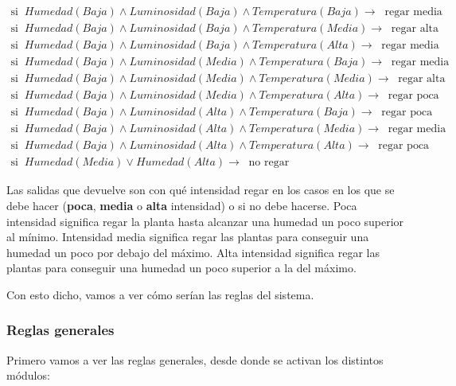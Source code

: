 \documentclass[11pt,a4paper]{article}
\begin{document}
\begin{gather*}
	\text{si} \; \; Humedad(Baja) \land Luminosidad(Baja) \land Temperatura(Baja) \rightarrow \; \; \text{regar media} \\
	\text{si} \; \; Humedad(Baja) \land Luminosidad(Baja) \land Temperatura(Media) \rightarrow \; \; \text{regar alta} \\
	\text{si} \; \; Humedad(Baja) \land Luminosidad(Baja) \land Temperatura(Alta) \rightarrow \; \; \text{regar media} \\
	\text{si} \; \; Humedad(Baja) \land Luminosidad(Media) \land Temperatura(Baja) \rightarrow \; \; \text{regar media} \\
	\text{si} \; \; Humedad(Baja) \land Luminosidad(Media) \land Temperatura(Media) \rightarrow \; \; \text{regar alta} \\
	\text{si} \; \; Humedad(Baja) \land Luminosidad(Media) \land Temperatura(Alta) \rightarrow \; \; \text{regar poca} \\
	\text{si} \; \; Humedad(Baja) \land Luminosidad(Alta) \land Temperatura(Baja) \rightarrow \; \; \text{regar poca} \\
	\text{si} \; \; Humedad(Baja) \land Luminosidad(Alta) \land Temperatura(Media) \rightarrow \; \; \text{regar media} \\
	\text{si} \; \; Humedad(Baja) \land Luminosidad(Alta) \land Temperatura(Alta) \rightarrow \; \; \text{regar poca} \\
	\text{si} \; \; Humedad(Media) \lor Humedad(Alta) \rightarrow \; \; \text{no regar}
\end{gather*}

Las salidas que devuelve son con qué intensidad regar en los casos en los que se debe hacer (\textbf{poca}, \textbf{media} o
\textbf{alta} intensidad) o si no debe hacerse. Poca intensidad significa regar la planta hasta alcanzar una humedad un poco
superior al mínimo. Intensidad media significa regar las plantas para conseguir una humedad un poco por debajo del máximo. Alta
intensidad significa regar las plantas para conseguir una humedad un poco superior a la del máximo.

Con esto dicho, vamos a ver cómo serían las reglas del sistema.

\subsubsection{Reglas generales}

Primero vamos a ver las reglas generales, desde donde se activan los distintos módulos:
\end{document}

